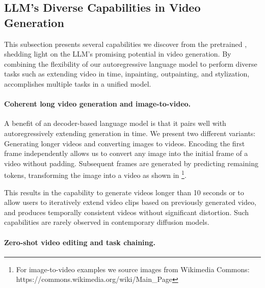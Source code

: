 \vspace{-2mm}
\subsection{LLM's Diverse Capabilities in Video Generation}
\label{sec:capabilities_whole}

This subsection presents several capabilities we discover from the pretrained \modelname{}, shedding light on the LLM's promising potential in video generation. By combining the flexibility of our autoregressive language model to perform diverse tasks such as extending video in time, inpainting, outpainting, and stylization, \modelname{} accomplishes multiple tasks in a unified model.


\vspace{-4mm}
\paragraph{Coherent long video generation and image-to-video.}





A benefit of an decoder-based language model is that it pairs well with autoregressively extending generation in time. 
%
We present two different variants: Generating longer videos and converting images to videos. 
Encoding the first frame independently allows us to convert any image into the initial frame of a video without padding. Subsequent frames are generated by predicting remaining tokens, transforming the image into a video as shown in \footnote{For image-to-video examples we source images from Wikimedia Commons: https://commons.wikimedia.org/wiki/Main\_Page}.

This results in the capability to generate videos longer than 10 seconds or to allow users to iteratively extend video clips based on previously generated video, and produces temporally consistent videos without significant distortion.
Such capabilities are rarely observed in contemporary diffusion models.

\vspace{-4mm}
\paragraph{Zero-shot video editing and task chaining.} \label{sec:capabilities}
% 

% 

